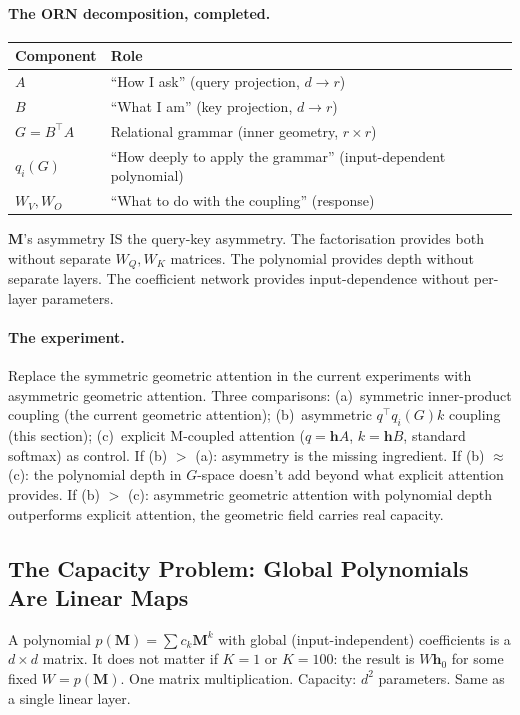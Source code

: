 \documentclass[11pt, a4paper]{article}
\newcommand{\M}{\mathbf{M}}
\newcommand{\h}{\mathbf{h}}
\theoremstyle{plain}
\theoremstyle{definition}
\theoremstyle{remark}
\begin{document}
\paragraph{The ORN decomposition, completed.}
\begin{center}\small
\begin{tabular}{ll}
\toprule
\textbf{Component} & \textbf{Role} \\
\midrule
$A$ & ``How I ask'' (query projection, $d \to r$) \\
$B$ & ``What I am'' (key projection, $d \to r$) \\
$G = B^\top A$ & Relational grammar (inner geometry, $r \times r$) \\
$q_i(G)$ & ``How deeply to apply the grammar'' (input-dependent polynomial) \\
$W_V, W_O$ & ``What to do with the coupling'' (response) \\
\bottomrule
\end{tabular}
\end{center}

$\M$'s asymmetry IS the query-key asymmetry.
The factorisation provides both without separate $W_Q, W_K$ matrices.
The polynomial provides depth without separate layers.
The coefficient network provides input-dependence without per-layer parameters.

\paragraph{The experiment.}
Replace the symmetric geometric attention in the current experiments with asymmetric geometric attention.
Three comparisons:
(a)~symmetric inner-product coupling (the current geometric attention);
(b)~asymmetric $q^\top q_i(G) k$ coupling (this section);
(c)~explicit M-coupled attention ($q = \h A$, $k = \h B$, standard softmax) as control.
If (b) $>$ (a): asymmetry is the missing ingredient.
If (b) $\approx$ (c): the polynomial depth in $G$-space doesn't add beyond what explicit attention provides.
If (b) $>$ (c): asymmetric geometric attention with polynomial depth outperforms explicit attention, the geometric field carries real capacity.

\subsection{The Capacity Problem: Global Polynomials Are Linear Maps}
\label{sec:capacity-problem}

A polynomial $p(\M) = \sum c_k \M^k$ with global (input-independent) coefficients is a $d \times d$ matrix.
It does not matter if $K = 1$ or $K = 100$: the result is $W \h_0$ for some fixed $W = p(\M)$.
One matrix multiplication.
Capacity: $d^2$ parameters.
Same as a single linear layer.
\end{document}
